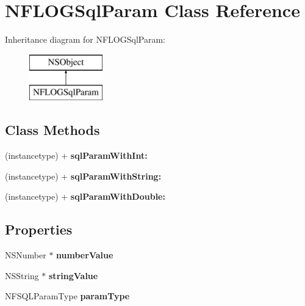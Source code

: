 \hypertarget{interface_n_f_l_o_g_sql_param}{}\section{N\+F\+L\+O\+G\+Sql\+Param Class Reference}
\label{interface_n_f_l_o_g_sql_param}
Inheritance diagram for N\+F\+L\+O\+G\+Sql\+Param\+:\begin{figure}[H]
\begin{center}
\leavevmode
\includegraphics[height=2.000000cm]{interface_n_f_l_o_g_sql_param}
\end{center}
\end{figure}
\subsection*{Class Methods}
\begin{DoxyCompactItemize}
\item 
\mbox{\label{interface_n_f_l_o_g_sql_param_a995d619df1c193ae4b6940c100098621}} 
(instancetype) + {\bfseries sql\+Param\+With\+Int\+:}
\item 
\mbox{\label{interface_n_f_l_o_g_sql_param_af1d837ff887168e88a51ee37e72e61e5}} 
(instancetype) + {\bfseries sql\+Param\+With\+String\+:}
\item 
\mbox{\label{interface_n_f_l_o_g_sql_param_a80737667330084589a0a02dec8860c7a}} 
(instancetype) + {\bfseries sql\+Param\+With\+Double\+:}
\end{DoxyCompactItemize}
\subsection*{Properties}
\begin{DoxyCompactItemize}
\item 
\mbox{\label{interface_n_f_l_o_g_sql_param_a2e606eacd2424b48821250bd29fcd108}} 
N\+S\+Number $\ast$ {\bfseries number\+Value}
\item 
\mbox{\label{interface_n_f_l_o_g_sql_param_a5764697810ad60f7810afbd799ecde73}} 
N\+S\+String $\ast$ {\bfseries string\+Value}
\item 
\mbox{\label{interface_n_f_l_o_g_sql_param_af0efe41a334a4f143da59126af14aade}} 
N\+F\+S\+Q\+L\+Param\+Type {\bfseries param\+Type}
\end{DoxyCompactItemize}


